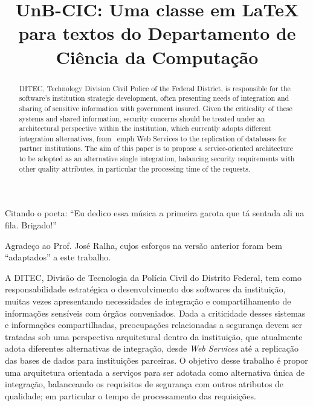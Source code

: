 \documentclass[mpca]{unb-cic}
\title{UnB-CIC: Uma classe em LaTeX para textos do Departamento de Ciência da Computação}%
\begin{document}
  \maketitle

  \begin{dedicatoria}
Citando o poeta: ``Eu dedico essa música a primeira garota que tá sentada ali na fila. Brigado!''
  \end{dedicatoria}

  \begin{agradecimentos}
Agradeço ao Prof. José Ralha, cujos esforços na versão anterior foram bem ``adaptados'' a este trabalho.
  \end{agradecimentos}


\begin{resumo}
  A DITEC, Divisão de Tecnologia da Polícia Civil do Distrito Federal, tem como responsabilidade estratégica o desenvolvimento dos softwares da instituição, muitas vezes apresentando necessidades de integração e compartilhamento de informações sensíveis com órgãos conveniados. Dada a criticidade desses sistemas e informações compartilhadas, preocupações relacionadas a segurança devem ser tratadas sob uma perspectiva arquitetural dentro da instituição, que atualmente adota diferentes alternativas de integração, desde \emph{Web Services} até a replicação das bases de dados para instituições parceiras. O objetivo desse trabalho é propor uma arquitetura orientada a serviços para ser adotada como alternativa única de integração, balanceando os requisitos de segurança com outros atributos de qualidade; em particular o tempo de processamento das requisições.
\end{resumo}

\begin{abstract}
 DITEC, Technology Division Civil Police of the Federal District, is responsible for the software's institution strategic development, often presenting needs of integration and sharing of sensitive information with government insured. Given the criticality of these systems and shared information, security concerns should be treated under an architectural perspective within the institution, which currently adopts different integration alternatives, from \ emph {Web Services} to the replication of databases for partner institutions. The aim of this paper is to propose a service-oriented architecture to be adopted as an alternative single integration, balancing security requirements with other quality attributes, in particular the processing time of the requests.

\end{abstract}
  \tableofcontents
  \listoffigures
  \listoftables
  
\end{document}
